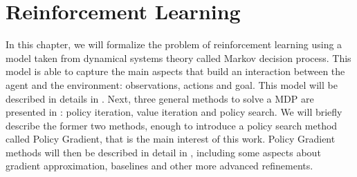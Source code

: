 \chapter{Reinforcement Learning}
\label{ch:rl}
\thispagestyle{empty}

In this chapter, we will formalize the problem of reinforcement learning using a model taken from dynamical systems theory called Markov decision process. This model is able to capture the main aspects that build an interaction between the agent and the environment: observations, actions and goal. This model will be described in details in . Next, three general methods to solve a MDP are presented in : policy iteration, value iteration and policy search. We will briefly describe the former two methods, enough to introduce a policy search method called Policy Gradient, that is the main interest of this work. Policy Gradient methods will then be described in detail in , including some aspects about gradient approximation, baselines and other more advanced refinements.








